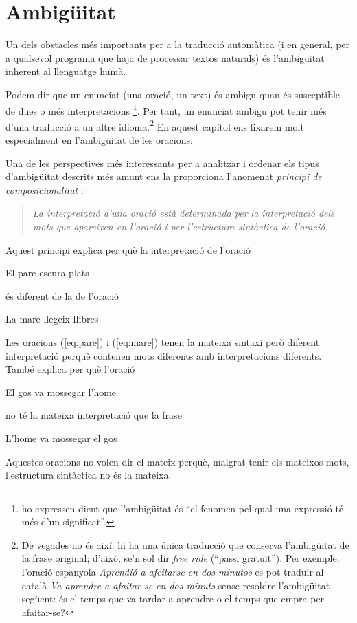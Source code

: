 \chapter{Ambigüitat}
\label{se:ambig}




Un dels obstacles més importants per a la traducció automàtica (i en
general, per a qualsevol programa que haja de processar textos
naturals) és l'am\-bi\-güi\-tat inherent al llenguatge humà. 

Podem dir que un enunciat (una oració, un text) és ambigu quan és
susceptible de dues o més interpretacions
\citep{alcaraz97b}\footnote{\citet{don96u} ho expressen dient que
  l'ambigüitat és ``el fenomen pel qual una expressió té més d'un
  significat''.}. Per tant, un enunciat ambigu pot tenir més d'una
traducció a un altre idioma.\footnote{De vegades no és així: hi ha una
  única traducció que conserva l'ambigüitat de la frase original;
  d'això, se'n sol dir \emph{free ride} (``passi gratuït''). Per
  exemple, l'oració espanyola \emph{Aprendió a afeitarse en dos
    minutos} es pot traduir al català \emph{Va aprendre a afaitar-se
    en dos minuts} sense resoldre l'ambigüitat següent: és el temps
  que va tardar a aprendre o el temps que empra per afaitar-se?} En
aquest capítol ens fixarem molt especialment en l'ambigüitat de les
oracions.

Una de les perspectives més interessants per a analitzar i ordenar els
tipus d'ambigüitat descrits més amunt ens la proporciona l'anomenat
\emph{principi de composicionalitat}  \citep[cap.~23]{radford09b}:
\begin{quote}
{\sl
La interpretació d'una oració està determinada per la interpretació
dels mots que apareixen en l'oració i per l'estructura sin\-tàc\-tica de
l'oració.
}
\end{quote}
Aquest principi explica per què la interpretació de l'oració
\begin{exemple}
\label{eq:pare}
El pare escura plats
\end{exemple}
 és diferent de la de l'oració
\begin{exemple} 
La mare llegeix
  llibres
\label{eq:mare}
\end{exemple}
Les oracions (\ref{eq:pare}) i (\ref{eq:mare}) tenen la mateixa sintaxi però diferent
interpretació perquè contenen mots diferents amb interpretacions
diferents. També explica per què l'oració 
\begin{exemple}
El gos va mossegar
  l'home
\end{exemple}
 no té la mateixa interpretació que la frase 
\begin{exemple}
L'home va
  mossegar el gos
\end{exemple} 
Aquestes oracions no volen dir el mateix perquè, malgrat tenir els
mateixos mots, l'estructura sintàctica no és la mateixa.


